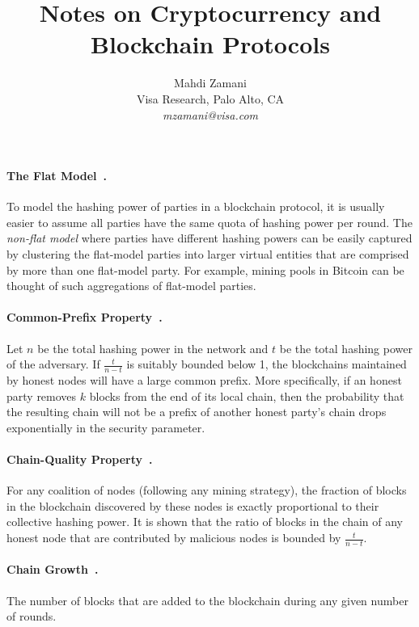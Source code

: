 \documentclass[11pt]{article}
\theoremstyle{mytheoremstyle}
\begin{document}
\title{Notes on Cryptocurrency and Blockchain Protocols}

\author{Mahdi Zamani\\ Visa Research, Palo Alto, CA \\ \textit{mzamani@visa.com}}
\date{}

\maketitle

\paragraph{The Flat Model~\cite{garay2015bitcoin}.} To model the hashing power of parties in a blockchain protocol, it is usually easier to assume all parties have the same quota of hashing power per round. The \emph{non-flat model} where parties have different hashing powers can be easily captured by clustering the flat-model parties into larger virtual entities that are comprised by more than one flat-model party. For example, mining pools in Bitcoin can be thought of such aggregations of flat-model parties.

\paragraph{Common-Prefix Property~\cite{garay2015bitcoin}.} Let $n$ be the total hashing power in the network and $t$ be the total hashing power of the adversary. If $\frac{t}{n-t}$ is suitably bounded below 1, the blockchains maintained by honest nodes will have a large common prefix. More specifically, if an honest party removes $k$ blocks from the end of its local chain, then the probability that the resulting chain will not be a prefix of another honest party's chain drops exponentially in the security parameter. 

\paragraph{Chain-Quality Property~\cite{garay2015bitcoin}.} For any coalition of nodes (following any mining strategy), the fraction of blocks in the blockchain discovered by these nodes is exactly proportional to their collective hashing power. It is shown that the ratio of blocks in the chain of any honest node that are contributed by malicious nodes is bounded by $\frac{t}{n-t}$.

\paragraph{Chain Growth~\cite{cryptoeprint:2016:545}.} The number of blocks that are added to the blockchain during any given number of rounds.
\end{document}
